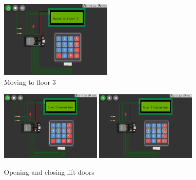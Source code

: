 \documentclass{article}
\begin{document}
\begin{figure}[htbp] %
  \centering
  \includegraphics[width=0.5\textwidth]{img/3_move.png} %
  \caption{Moving to floor 3}
\end{figure}


\begin{figure}[!htbp] %
  \centering

  \includegraphics[width=0.45\textwidth]{img/3_open.png} %
\includegraphics[width=0.45\textwidth]{img/3_close.png}
  \caption{Opening and closing lift doors}
\end{figure}
\end{document}
